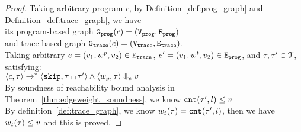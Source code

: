\begin{proof}
Taking arbitrary program $c$,
by Definition~\ref{def:prog_graph} and Definition~\ref{def:trace_graph}, 
we have   
\\
its program-based graph $\mathtt{{G_{prog}}}({c}) = (\mathtt{{V_{prog}}}, \mathtt{{E_{prog}}})$ 
\\
and 
trace-based graph $\mathtt{{G_{trace}}}({c}) = (\mathtt{{V_{trace}}}, \mathtt{{E_{trace}}})$.
\\
Taking arbitrary 
$e = (v_1, w^p, v_2) \in \mathtt{{E_{trace}}}$,
$e' = (v_1, w^t, v_2) \in \mathtt{{E_{prog}}}$, and $\mathtt{\tau}, \mathtt{\tau}' \in \mathcal{T}$, satisfying:
\\
$\langle {c}, \mathtt{\tau} \rangle \to^{*} \langle \mathtt{skip}, \mathtt{\tau}{\scriptscriptstyle ++}\mathtt{\tau}' \rangle 
\land 
\langle w_{p}, \mathtt{\tau} \rangle \Downarrow_e v$
\\
By soundness of reachability bound analysis in Theorem~\ref{thm:edgeweight_soundness}, we know 
$\mathtt{cnt}(\mathtt{\tau}', l) \leq v$
\\
By definition~\ref{def:trace_graph}, we know $w_t(\mathtt{\tau}) = \mathtt{cnt}(\mathtt{\tau}', l)$,
then we have $w_t(\mathtt{\tau}) \leq v$ and this is proved.
\end{proof}

